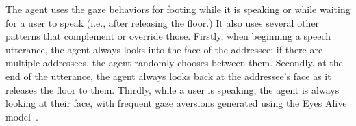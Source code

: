 The agent uses the gaze behaviors for footing while it is speaking or while waiting for a user to speak (i.e., after releasing the floor.) It also uses several other patterns that complement or override those. Firstly, when beginning a speech utterance, the agent always looks into the face of the addressee; if there are multiple addressees, the agent randomly chooses between them. Secondly, at the end of the utterance, the agent always looks back at the addressee's face as it releases the floor to them. Thirdly, while a user is speaking, the agent is always looking at their face, with frequent gaze aversions generated using the Eyes Alive model~\citep{lee2002eyes}. 